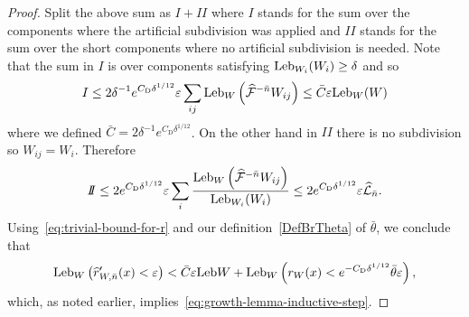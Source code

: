 \documentclass[10pt]{amsart}
\theoremstyle{definition}\newtheorem{defi}[theo]{Definition}\newtheorem{rema}[theo]{Remark}\newtheorem{exam}[theo]{Example}\newtheorem{exem}[theo]{Example}\newtheorem{nota}[theo]{Notation}
\newcommand{\eps}{\varepsilon}
\newcommand{\inv}{^{-1}}
\newcommand{\cm}{\mathcal{F}}
\newcommand{\cmp}{\hat\cm}
\newcommand{\cL}{\mathcal{L}}
\newcommand{\Leb}{\textup{Leb}}
\newcommand{\Cdist}{C_\mathrm{D}}
\newcommand*\RmII{{{I\!\!I}}}
\let\oldhat\hat
\renewcommand*{\hat}[1]{\mathchoice{\widehat{#1}}{\widehat{#1}}{\oldhat{#1}}{\oldhat{#1}}}
\begin{document}
\begin{proof}
Split the above sum as $I+\RmII$ where $I$ stands for the sum over the components where the artificial subdivision was applied and $\RmII$ stands for the sum over the short components where no artificial subdivision is needed. Note that the sum in $I$ is over components satisfying $\Leb_{W_i}(W_i)\geq \delta$ and so
\begin{align*}
I\leq 2\delta\inv e^{\Cdist\delta^{1/12}}\eps
\sum_{ij}\Leb_{W}\left(\cmp^{-\bar n}W_{ij}\right) \le \bar C\eps\Leb_{W}(W)
\end{align*}
where we defined $\bar C = 2\delta\inv e^{\Cdist\delta^{1/12}}$. On the other hand in $\RmII$ there is no subdivision so $W_{ij}=W_i$. Therefore
\begin{align*}
\RmII\le 2e^{\Cdist\delta^{1/12}}\eps\sum_{i}\frac{\Leb_{W}\left(\cmp^{-\bar n}W_{ij}\right)}{\Leb_{W_{i}}(W_{i})} \le 2e^{\Cdist\delta^{1/12}}\eps\hat\cL_{\bar n}.
\end{align*}
Using~\eqref{eq:trivial-bound-for-r} and our definition~\eqref{DefBrTheta} of $\bar\theta$, we conclude that
\begin{align}\label{eq:growth-lemma-inductive-step-r'}
\Leb_{W}\left(\hat r'_{W,\bar n}(x) < \eps\right) < \bar C\eps\Leb W + \Leb_{W}\left(r_{W}(x) < e^{-\Cdist\delta^{1/12}}\bar\theta\eps\right),
\end{align}
which, as noted earlier, implies~\eqref{eq:growth-lemma-inductive-step}.


\end{proof}
\end{document}
